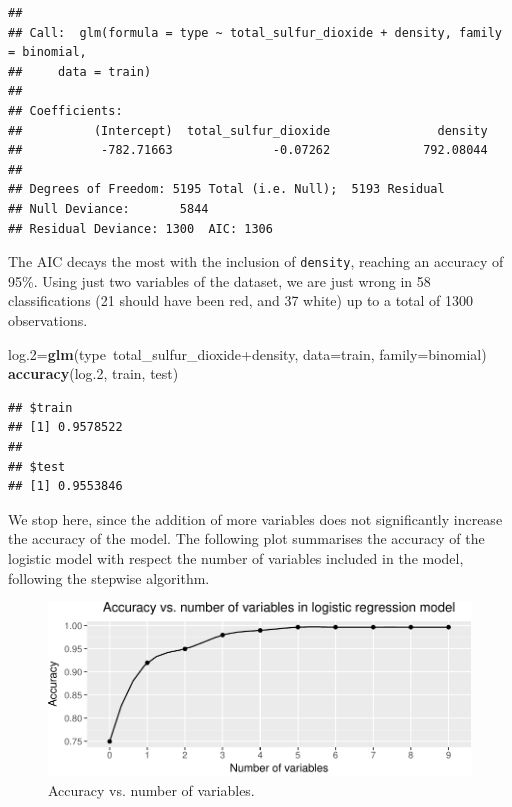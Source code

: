 \documentclass[12pt,]{article}
\newenvironment{Shaded}{\begin{snugshade}}{\end{snugshade}}
\newcommand{\KeywordTok}[1]{\textcolor[rgb]{0.13,0.29,0.53}{\textbf{{#1}}}}
\newcommand{\DataTypeTok}[1]{\textcolor[rgb]{0.13,0.29,0.53}{{#1}}}
\newcommand{\FloatTok}[1]{\textcolor[rgb]{0.00,0.00,0.81}{{#1}}}
\newcommand{\NormalTok}[1]{{#1}}
\begin{document}
\begin{verbatim}
## 
## Call:  glm(formula = type ~ total_sulfur_dioxide + density, family = binomial, 
##     data = train)
## 
## Coefficients:
##          (Intercept)  total_sulfur_dioxide               density  
##           -782.71663              -0.07262             792.08044  
## 
## Degrees of Freedom: 5195 Total (i.e. Null);  5193 Residual
## Null Deviance:       5844 
## Residual Deviance: 1300  AIC: 1306
\end{verbatim}

The AIC decays the most with the inclusion of \texttt{density}, reaching
an accuracy of 95\%. Using just two variables of the dataset, we are
just wrong in 58 classifications (21 should have been red, and 37 white)
up to a total of 1300 observations.

\begin{Shaded}
\begin{Highlighting}[]
\NormalTok{log}\FloatTok{.2}\NormalTok{=}\KeywordTok{glm}\NormalTok{(type~total_sulfur_dioxide+density, }\DataTypeTok{data=}\NormalTok{train, }\DataTypeTok{family=}\NormalTok{binomial)}
\KeywordTok{accuracy}\NormalTok{(log}\FloatTok{.2}\NormalTok{, train, test)}
\end{Highlighting}
\end{Shaded}

\begin{verbatim}
## $train
## [1] 0.9578522
## 
## $test
## [1] 0.9553846
\end{verbatim}

We stop here, since the addition of more variables does not
significantly increase the accuracy of the model. The following plot
summarises the accuracy of the logistic model with respect the number of
variables included in the model, following the stepwise algorithm.

\begin{figure}

{\centering \includegraphics{logistic-regression_files/figure-latex/model_comparison-1} 

}

\caption{Accuracy vs. number of variables.}\label{fig:model_comparison}
\end{figure}
\end{document}
